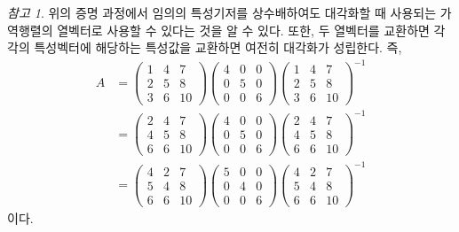 \documentclass[unfonts,oneside,a4paper]{oblivoir}
\theoremstyle{definition}
\theoremstyle{theorem}
\theoremstyle{theorem}
\theoremstyle{remark}
\newtheorem*{remark}{참고}
\theoremstyle{remark}
\theoremstyle{remark}
\theoremstyle{remark}
\begin{document}
\begin{remark}
    위의 증명 과정에서 임의의 특성기저를 상수배하여도 대각화할 때 사용되는 가역행렬의 열벡터로 사용할 수 있다는 것을 알 수 있다.
    또한, 두 열벡터를 교환하면 각각의 특성벡터에 해당하는 특성값을 교환하면 여전히 대각화가 성립한다.
    즉,
    \begin{align*}
        A &=
        \begin{pmatrix}
            1 & 4 & 7\\
            2 & 5 & 8\\
            3 & 6 & 10
        \end{pmatrix}
        \begin{pmatrix}
            4 & 0 & 0\\
            0 & 5 & 0\\
            0 & 0 & 6
        \end{pmatrix}
        \begin{pmatrix}
            1 & 4 & 7\\
            2 & 5 & 8\\
            3 & 6 & 10
        \end{pmatrix}^{-1}\\
          &=
        \begin{pmatrix}
            2 & 4 & 7\\
            4 & 5 & 8\\
            6 & 6 & 10
        \end{pmatrix}
        \begin{pmatrix}
            4 & 0 & 0\\
            0 & 5 & 0\\
            0 & 0 & 6
        \end{pmatrix}
        \begin{pmatrix}
            2 & 4 & 7\\
            4 & 5 & 8\\
            6 & 6 & 10
        \end{pmatrix}^{-1}\\
          &=
        \begin{pmatrix}
            4 & 2 & 7\\
            5 & 4 & 8\\
            6 & 6 & 10
        \end{pmatrix}
        \begin{pmatrix}
            5 & 0 & 0\\
            0 & 4 & 0\\
            0 & 0 & 6
        \end{pmatrix}
        \begin{pmatrix}
            4 & 2 & 7\\
            5 & 4 & 8\\
            6 & 6 & 10
        \end{pmatrix}^{-1}
    \end{align*}
    이다.
\end{remark}
\end{document}
